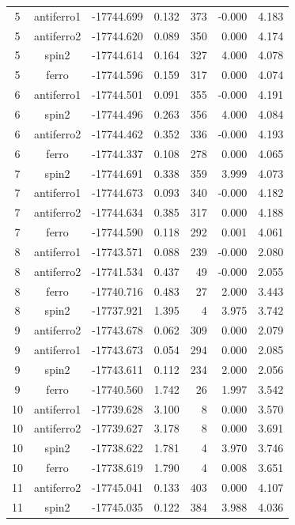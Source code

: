 \begin{longtable}{@{}ccrrrrr@{}}
\rowcolor{gray!20} 5 & antiferro1 & -17744.699 & 0.132 & 373 & -0.000 & 4.183 \\
5 & antiferro2 & -17744.620 & 0.089 & 350 & 0.000 & 4.174 \\
5 & spin2 & -17744.614 & 0.164 & 327 & 4.000 & 4.078 \\
5 & ferro & -17744.596 & 0.159 & 317 & 0.000 & 4.074 \\
\rowcolor{gray!20} 6 & antiferro1 & -17744.501 & 0.091 & 355 & -0.000 & 4.191 \\
6 & spin2 & -17744.496 & 0.263 & 356 & 4.000 & 4.084 \\
6 & antiferro2 & -17744.462 & 0.352 & 336 & -0.000 & 4.193 \\
6 & ferro & -17744.337 & 0.108 & 278 & 0.000 & 4.065 \\
\rowcolor{gray!20} 7 & spin2 & -17744.691 & 0.338 & 359 & 3.999 & 4.073 \\
7 & antiferro1 & -17744.673 & 0.093 & 340 & -0.000 & 4.182 \\
7 & antiferro2 & -17744.634 & 0.385 & 317 & 0.000 & 4.188 \\
7 & ferro & -17744.590 & 0.118 & 292 & 0.001 & 4.061 \\
\rowcolor{gray!20} 8 & antiferro1 & -17743.571 & 0.088 & 239 & -0.000 & 2.080 \\
8 & antiferro2 & -17741.534 & 0.437 & 49 & -0.000 & 2.055 \\
8 & ferro & -17740.716 & 0.483 & 27 & 2.000 & 3.443 \\
8 & spin2 & -17737.921 & 1.395 & 4 & 3.975 & 3.742 \\
\rowcolor{gray!20} 9 & antiferro2 & -17743.678 & 0.062 & 309 & 0.000 & 2.079 \\
9 & antiferro1 & -17743.673 & 0.054 & 294 & 0.000 & 2.085 \\
9 & spin2 & -17743.611 & 0.112 & 234 & 2.000 & 2.056 \\
9 & ferro & -17740.560 & 1.742 & 26 & 1.997 & 3.542 \\
\rowcolor{gray!20} 10 & antiferro1 & -17739.628 & 3.100 & 8 & 0.000 & 3.570 \\
10 & antiferro2 & -17739.627 & 3.178 & 8 & 0.000 & 3.691 \\
10 & spin2 & -17738.622 & 1.781 & 4 & 3.970 & 3.746 \\
10 & ferro & -17738.619 & 1.790 & 4 & 0.008 & 3.651 \\
\rowcolor{gray!20} 11 & antiferro2 & -17745.041 & 0.133 & 403 & 0.000 & 4.107 \\
11 & spin2 & -17745.035 & 0.122 & 384 & 3.988 & 4.036 \\

\end{longtable}
